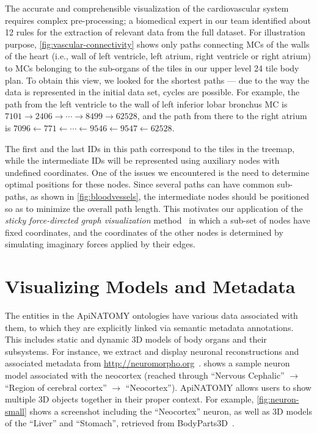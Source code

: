 The accurate and comprehensible visualization of the cardiovascular system requires complex pre-processing; a biomedical expert in our team identified about 12 rules for the extraction of relevant data from the full dataset.
For illustration purpose, \cref{fig:vascular-connectivity} shows only paths connecting MCs of the walls of the heart (i.e., wall of left ventricle, left atrium, right ventricle or right atrium) to MCs belonging to the sub-organs of the tiles in our upper level 24 tile body plan. To obtain this view, we looked for the shortest paths --- due to the way the data is represented in the initial data set, cycles are possible. For example, the path from the left ventricle to the wall of left inferior lobar bronchus MC is
{$7101 \rightarrow 2406 \rightarrow \cdots \rightarrow 8499 \rightarrow 62528$,}
and the path from there to the right atrium is
{$7096 \leftarrow 771 \leftarrow \cdots \leftarrow 9546 \leftarrow 9547 \leftarrow 62528$.}

The first and the last IDs in this path correspond to the tiles in the treemap, while the intermediate IDs will be represented using auxiliary nodes with undefined coordinates. One of the issues we encountered is the need to determine optimal positions for these nodes. Since several paths can have common sub-paths, as shown in \cref{fig:bloodvessels}, the intermediate nodes should be positioned so as to minimize the overall path length. This motivates our application of the \emph{sticky force-directed graph visualization} method~\cite{FR91,Bos14} in which a sub-set of nodes have fixed coordinates, and the coordinates of the other nodes is determined by simulating imaginary forces applied by their edges.


\section{Visualizing Models and Metadata} \label{sect:visualization2}                    %

The entities in the ApiNATOMY ontologies have various data associated with them, to which they are explicitly linked via semantic metadata annotations. This includes static and dynamic 3D models of body organs and their subsystems.
For instance, we extract and display neuronal reconstructions and associated metadata from \url{http://neuromorpho.org}~\cite{Asc06}.
 shows a sample neuron model associated with the neocortex (reached through ``Nervous Cephalic'' $\rightarrow$ ``Region of cerebral cortex'' $\rightarrow$ ``Neocortex''). ApiNATOMY allows users to show multiple 3D objects together in their proper context. For example, \cref{fig:neuron-small} shows a screenshot including the ``Neocortex'' neuron, as well as 3D models of the ``Liver'' and ``Stomach'', retrieved from BodyParts3D~\cite{MFT+09}.

